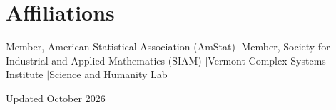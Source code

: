 \documentclass[10pt,letterpaper]{article}
\begin{document}
\section*{Affiliations}
Member, American Statistical Association (AmStat) \enspace$\vert$\enspace Member, Society for Industrial and Applied Mathematics (SIAM) \enspace$\vert$\enspace Vermont Complex Systems Institute \enspace$\vert$\enspace Science and Humanity Lab

\vfill
\begin{center}
  {\small\color{muted} Updated October 2026}
\end{center}
\end{document}
